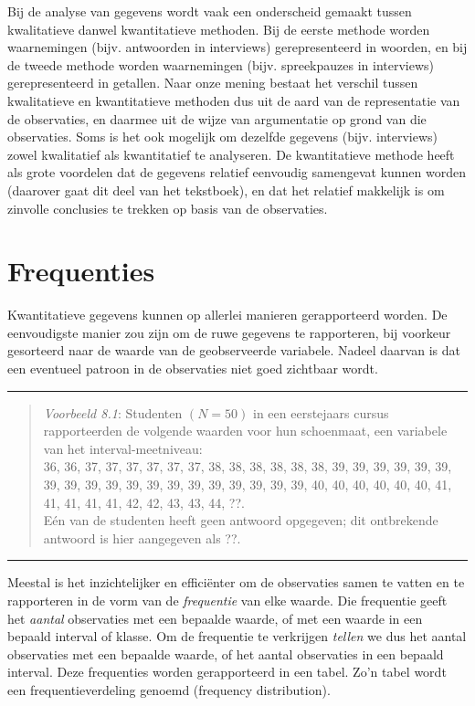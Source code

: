 \documentclass[
]{book}
\begin{document}
Bij de analyse van gegevens wordt vaak een onderscheid gemaakt tussen
kwalitatieve danwel kwantitatieve methoden. Bij de eerste methode worden
waarnemingen (bijv. antwoorden in interviews) gerepresenteerd in
woorden, en bij de tweede methode worden waarnemingen (bijv.
spreekpauzes in interviews) gerepresenteerd in getallen. Naar onze
mening bestaat het verschil tussen kwalitatieve en kwantitatieve
methoden dus uit de aard van de representatie van de observaties, en
daarmee uit de wijze van argumentatie op grond van die observaties. Soms
is het ook mogelijk om dezelfde gegevens (bijv. interviews) zowel
kwalitatief als kwantitatief te analyseren. De kwantitatieve methode
heeft als grote voordelen dat de gegevens relatief eenvoudig samengevat
kunnen worden (daarover gaat dit deel van het tekstboek), en dat het
relatief makkelijk is om zinvolle conclusies te trekken op basis van de
observaties.

\section{Frequenties}\label{sec:frequenties}

Kwantitatieve gegevens kunnen op allerlei manieren gerapporteerd worden.
De eenvoudigste manier zou zijn om de ruwe gegevens te rapporteren, bij
voorkeur gesorteerd naar de waarde van de geobserveerde variabele.
Nadeel daarvan is dat een eventueel patroon in de observaties niet goed
zichtbaar wordt.

\begin{center}\rule{0.5\linewidth}{0.5pt}\end{center}

\begin{quote}
\emph{Voorbeeld 8.1}: Studenten \((N=50)\) in een eerstejaars
cursus rapporteerden de volgende waarden voor hun schoenmaat, een
variabele van het interval-meetniveau:\\
36, 36, 37, 37, 37, 37, 37, 37, 38, 38, 38, 38, 38, 38, 39, 39, 39, 39,
39, 39, 39, 39, 39, 39, 39, 39, 39, 39, 39, 39, 39, 39, 39, 40, 40, 40,
40, 40, 40, 41, 41, 41, 41, 41, 42, 42, 43, 43, 44, ??.\\
Eén van de studenten heeft geen antwoord opgegeven; dit ontbrekende
antwoord is hier aangegeven als ??.
\end{quote}

\begin{center}\rule{0.5\linewidth}{0.5pt}\end{center}

Meestal is het inzichtelijker en efficiënter om de observaties samen te
vatten en te rapporteren in de vorm van de \emph{frequentie} van elke waarde.
Die frequentie geeft het \emph{aantal} observaties met een bepaalde waarde,
of met een waarde in een bepaald interval of klasse. Om de frequentie te
verkrijgen \emph{tellen} we dus het aantal observaties met een bepaalde
waarde, of het aantal observaties in een bepaald interval. Deze
frequenties worden gerapporteerd in een tabel. Zo'n tabel wordt een
frequentieverdeling genoemd (frequency distribution).
\end{document}
